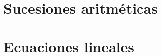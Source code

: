 \documentclass[12pt,addpoints,answers]{repaso}
\begin{document}
\begin{questions}
    \section*   {Sucesiones aritméticas}







    \section*   {Ecuaciones lineales}









\end{questions}
\end{document}
